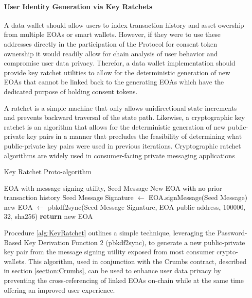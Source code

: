 \paragraph{User Identity Generation via Key Ratchets}
\label{section:UserIdentityGeneration}

A data wallet should allow users to index transaction history and asset owership from multiple EOAs or smart wallets. However, if they were to use these addresses directly in the participation of 
the Protocol for consent token ownership it would readily allow for chain analysis of user behavior and compromise user data privacy. Therefor, a data wallet
implementation should provide key ratchet utilities to allow for the deterministic generation of new EOAs that cannot be linked back to the generating EOAs which have the dedicated purpose of holding consent tokens. 

A ratchet is a simple machine that only allows unidirectional state increments and prevents backward traversal of the state path. Likewise, a cryptographic
key ratchet is an algorithm that allows for the deterministic generation of new public-private key pairs in a manner that precludes the feasibility of determining
what public-private key pairs were used in previous iterations. Cryptographic ratchet algorithms are widely used in consumer-facing private messaging applications

\begin{algorithm}
\caption{Key Ratchet Proto-algorithm}
\label{alg:KeyRatchet}
    \begin{algorithmic}
        \Require EOA with message signing utility, Seed Message
        \Ensure New EOA with no prior transaction history
        \State Seed Message Signature $\gets$ EOA.signMessage(Seed Message)
        \State new EOA $\gets$ pbkdf2sync(Seed Message Signature, EOA public address, 100000, 32, sha256)
        \State \textbf{return} new EOA
    \end{algorithmic}
\end{algorithm}

Procedure \ref{alg:KeyRatchet} outlines a simple technique, leveraging the Password-Based Key Derivation Function 2 (pbkdf2sync), to generate a new public-private key pair from the message signing utility exposed from most consumer crypto-wallets. This 
algorithm, used in conjunction with the Crumbs contract, described in section \ref{section:Crumbs}, can be used to enhance user data privacy by preventing the cross-referencing of linked EOAs on-chain while at the same time offering an improved user
experience. 

